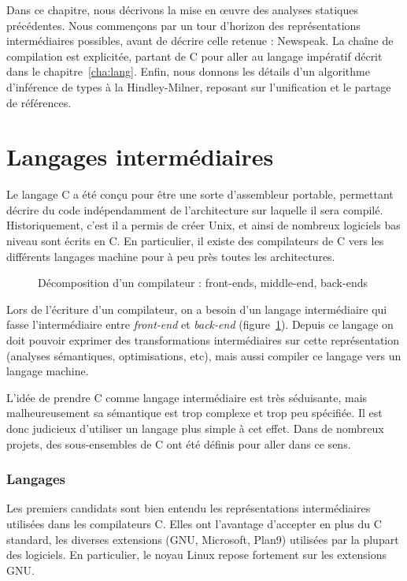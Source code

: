 Dans ce chapitre, nous décrivons la mise en œuvre des analyses statiques
précédentes. Nous commençons par un tour d'horizon des représentations
intermédiaires possibles, avant de décrire celle retenue : Newspeak. La chaîne
de compilation est explicitée, partant de C pour aller au langage impératif
décrit dans le chapitre~\ref{cha:lang}. Enfin, nous donnons les détails d'un
algorithme d'inférence de types à la Hindley-Milner, reposant sur l'unification
et le partage de références.

\section{Langages intermédiaires}

Le langage C \cite{KandR,AnsiC} a été conçu pour être une sorte d'assembleur
portable, permettant décrire du code indépendamment de l'architecture sur
laquelle il sera compilé. Historiquement, c'est il a permis de créer Unix, et
ainsi de nombreux logiciels bas niveau sont écrits en C. En particulier, il
existe des compilateurs de C vers les différents langages machine pour à peu
près toutes les architectures.

\begin{figure}
  \centering

  

  \caption{Décomposition d'un compilateur : front-ends, middle-end, back-ends}
  \label{fig:middle-end}
\end{figure}

Lors de l'écriture d'un compilateur, on a besoin d'un langage intermédiaire qui
fasse l'intermédiaire entre \emph{front-end} et \emph{back-end}
(figure~\ref{fig:middle-end}). Depuis ce langage on doit pouvoir exprimer des
transformations intermédiaires sur cette représentation (analyses sémantiques,
optimisations, etc), mais aussi compiler ce langage vers un langage machine.

L'idée de prendre C comme langage intermédiaire est très séduisante, mais
malheureusement sa sémantique est trop complexe et trop peu spécifiée. Il est
donc judicieux d'utiliser un langage plus simple à cet effet. Dans de nombreux
projets, des sous-ensembles de C ont été définis pour aller dans ce sens.

\subsubsection{Langages}

Les premiers candidats sont bien entendu les représentations intermédiaires
utilisées dans les compilateurs C. Elles ont l'avantage d'accepter en plus du C
standard, les diverses extensions (GNU, Microsoft, Plan9) utilisées par la
plupart des logiciels. En particulier, le noyau Linux repose fortement sur les
extensions GNU.

